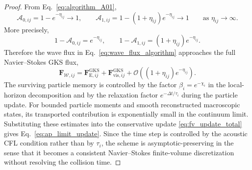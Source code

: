 \documentclass[10pt,a4paper]{amsart}
\begin{document}
\begin{proof}
From Eq.~\eqref{eq:algorithm_A01},
\begin{equation}
    \mathcal A_{0,ij}=1-e^{-\eta_{ij}}\to1,
    \qquad
    \mathcal A_{1,ij}=1-(1+\eta_{ij})e^{-\eta_{ij}}\to1
    \qquad
    \text{as }\eta_{ij}\to\infty .
\end{equation}
More precisely,
\[
    1-\mathcal A_{0,ij}=e^{-\eta_{ij}},
    \qquad
    1-\mathcal A_{1,ij}=(1+\eta_{ij})e^{-\eta_{ij}} .
\]
Therefore the wave flux in Eq.~\eqref{eq:wave_flux_algorithm} approaches the full Navier--Stokes GKS flux,
\begin{equation}
    \mathbf F_{\mathcal{W},ij}
    =
    \mathbf F_{\mathrm E,ij}^{\mathrm{GKS}}
    +
    \mathbf F_{\mathrm{vis},ij}^{\mathrm{GKS}}
    +
    \mathcal O\!\left((1+\eta_{ij})e^{-\eta_{ij}}\right) .
\end{equation}
The surviving particle memory is controlled by the factor $\beta_i=e^{-\chi_i}$ in the local-horizon decomposition and by the relaxation factor $e^{-\Delta t/\tau_i}$ during the particle update. For bounded particle moments and smooth reconstructed macroscopic states, its transported contribution is exponentially small in the continuum limit. Substituting these estimates into the conservative update \eqref{eq:fv_update_total} gives Eq.~\eqref{eq:ap_limit_update}. Since the time step is controlled by the acoustic CFL condition rather than by $\tau_i$, the scheme is asymptotic-preserving in the sense that it becomes a consistent Navier--Stokes finite-volume discretization without resolving the collision time.
\end{proof}
\end{document}
